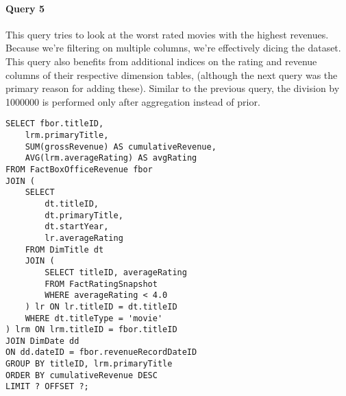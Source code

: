 \paragraph{Query 5}
This query tries to look at the worst rated movies with the highest revenues. Because we’re filtering on multiple columns, we’re effectively dicing the dataset. This query also benefits from additional indices on the rating and revenue columns of their respective dimension tables, (although the next query was the primary reason for adding these). Similar to the previous query, the division by 1000000 is performed only after aggregation instead of prior.
\begin{lstlisting}
SELECT fbor.titleID,
    lrm.primaryTitle,
    SUM(grossRevenue) AS cumulativeRevenue,
    AVG(lrm.averageRating) AS avgRating
FROM FactBoxOfficeRevenue fbor
JOIN (
    SELECT 
        dt.titleID, 
        dt.primaryTitle, 
        dt.startYear, 
        lr.averageRating
    FROM DimTitle dt
    JOIN (
        SELECT titleID, averageRating
        FROM FactRatingSnapshot
        WHERE averageRating < 4.0
    ) lr ON lr.titleID = dt.titleID
    WHERE dt.titleType = 'movie'
) lrm ON lrm.titleID = fbor.titleID
JOIN DimDate dd 
ON dd.dateID = fbor.revenueRecordDateID
GROUP BY titleID, lrm.primaryTitle
ORDER BY cumulativeRevenue DESC
LIMIT ? OFFSET ?;
\end{lstlisting}



